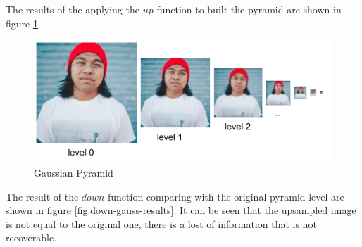The results of the applying the $up$ function to built the pyramid are shown in figure \ref{fig:gaussian_pyramid}

\begin{figure}[h!]
\centering
  \centering
  \includegraphics[width=0.9\linewidth]{output/gaussianPyramid.pdf}
  \caption{Gaussian Pyramid}
\label{fig:gaussian_pyramid}
\end{figure}

The result of the $down$ function comparing with the original pyramid level are shown in figure \ref{fig:down-gauss-results}. It can be seen that the upsampled image is not equal to the original one, there is a lost of information that is not recoverable.

